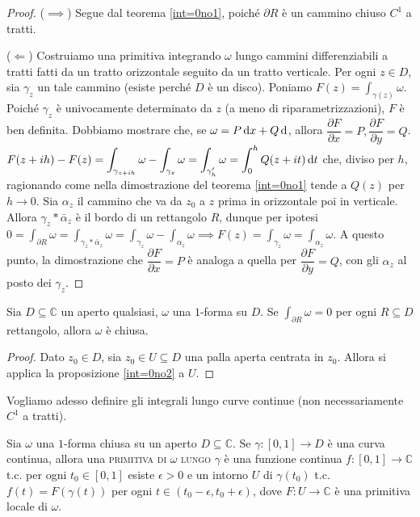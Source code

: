 \begin{proof}
  ($\implies$) Segue dal teorema \ref{int=0no1}, poiché $\partial R$ è un cammino chiuso $C^1$ a tratti.

  ($\Leftarrow$) Costruiamo una primitiva integrando $\omega$ lungo cammini differenziabili a tratti fatti da un tratto orizzontale seguito da un tratto verticale. Per ogni $z \in D$, sia $\gamma_z$ un tale cammino (esiste perché $D$ è un disco). Poniamo $\displaystyle F(z)=\int_{\gamma(z)} \omega$. Poiché $\gamma_z$ è univocamente determinato da $z$ (a meno di riparametrizzazioni), $F$ è ben definita. Dobbiamo mostrare che, se $\omega=P\mathop{}\!\mathrm{d} x+Q\mathop{}\!\mathrm{d} $, allora $\dfrac{\partial F}{\partial x}=P, \dfrac{\partial F}{\partial y}=Q$.
  $\displaystyle F(z+ih)-F(z)=\int_{\gamma_{z+ih}} \omega-\int_{\gamma_z} \omega=\int_{\gamma_h'} \omega=\int_0^h Q(z+it) \mathop{}\!\mathrm{d} t$ che, diviso per $h$, ragionando come nella dimostrazione del teorema \ref{int=0no1} tende a $Q(z)$ per $h \longrightarrow 0$. Sia $\alpha_z$ il cammino che va da $z_0$ a $z$ prima in orizzontale poi in verticale.
  Allora $\gamma_z * \bar{\alpha}_z$ è il bordo di un rettangolo $R$, dunque per ipotesi $\displaystyle 0=\int_{\partial R} \omega=\int_{\gamma_z*\bar{\alpha}_z} \omega=\int_{\gamma_z}\omega-\int_{\alpha_z} \omega \implies F(z)=\int_{\gamma_z}\omega=\int_{\alpha_z}\omega$.
  A questo punto, la dimostrazione che $\dfrac{\partial F}{\partial x}=P$ è analoga a quella per $\dfrac{\partial F}{\partial y}=Q$, con gli $\alpha_z$ al posto dei $\gamma_z$.
\end{proof}

\begin{cor} \label{intR=0}
  Sia $D \subseteq \mathbb{C}$ un aperto qualsiasi, $\omega$ una $1$-forma su $D$. Se $\displaystyle \int_{\partial R} \omega=0$ per ogni $R \subseteq D$ rettangolo, allora $\omega$ è chiusa.
\end{cor}

\begin{proof}
  Dato $z_0 \in D$, sia $z_0 \in U \subseteq D$ una palla aperta centrata in $z_0$. Allora si applica la proposizione \ref{int=0no2} a $U$.
\end{proof}

Vogliamo adesso definire gli integrali lungo curve continue (non necessariamente $C^1$ a tratti).

\begin{defn} \label{prim_gamma}
  Sia $\omega$ una $1$-forma chiusa su un aperto $D \subseteq \mathbb{C}$. Se $\gamma:[0, 1] \longrightarrow D$ è una curva continua, allora una \textsc{primitiva di $\omega$ lungo $\gamma$} è una funzione continua $f:[0, 1] \longrightarrow \mathbb{C}$ t.c. per ogni $t_0 \in [0, 1]$ esiste $\epsilon>0$ e un intorno $U$ di $\gamma(t_0)$ t.c.
  $f(t)=F(\gamma(t))$ per ogni $t \in (t_0-\epsilon, t_0+\epsilon)$, dove $F:U \longrightarrow \mathbb{C}$ è una primitiva locale di $\omega$.
\end{defn}

